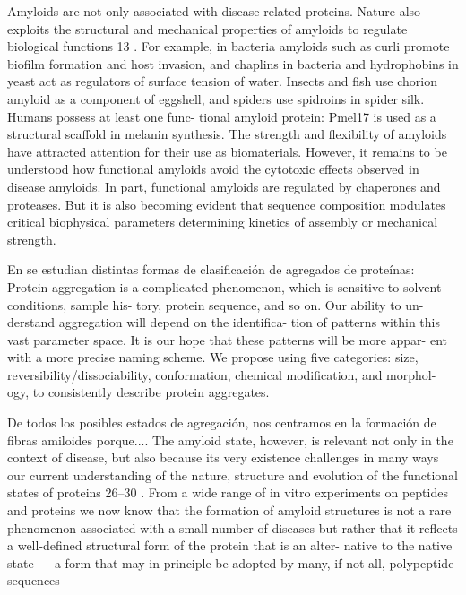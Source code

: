 Amyloids are not only associated with disease-related proteins.
Nature also exploits the structural and mechanical properties
of amyloids to regulate biological functions 13 . For example, in
bacteria amyloids such as curli promote biofilm formation and
host invasion, and chaplins in bacteria and hydrophobins in yeast
act as regulators of surface tension of water. Insects and fish
use chorion amyloid as a component of eggshell, and spiders
use spidroins in spider silk. Humans possess at least one func-
tional amyloid protein: Pmel17 is used as a structural scaffold
in melanin synthesis. The strength and flexibility of amyloids
have attracted attention for their use as biomaterials. However,
it remains to be understood how functional amyloids avoid the
cytotoxic effects observed in disease amyloids. In part, functional
amyloids are regulated by chaperones and proteases. But it is
also becoming evident that sequence composition modulates
critical biophysical parameters determining kinetics of assembly
or mechanical strength.
















En \cite{narhi2012classification} se estudian distintas formas de clasificación de agregados de proteínas:
Protein aggregation is a complicated phenomenon,
which is sensitive to solvent conditions, sample his-
tory, protein sequence, and so on. Our ability to un-
derstand aggregation will depend on the identifica-
tion of patterns within this vast parameter space. It
is our hope that these patterns will be more appar-
ent with a more precise naming scheme. We propose
using five categories: size, reversibility/dissociability,
conformation, chemical modification, and morphol-
ogy, to consistently describe protein aggregates.


De todos los posibles estados de agregación, nos centramos en la formación de fibras amiloides porque....
The amyloid state, however, is relevant not only in
the context of disease, but also because its very existence
challenges in many ways our current understanding of the
nature, structure and evolution of the functional states of
proteins 26–30 . From a wide range of in vitro experiments on
peptides and proteins we now know that the formation of
amyloid structures is not a rare phenomenon associated
with a small number of diseases but rather that it reflects a
well-defined structural form of the protein that is an alter-
native to the native state — a form that may in principle be
adopted by many, if not all, polypeptide sequences







